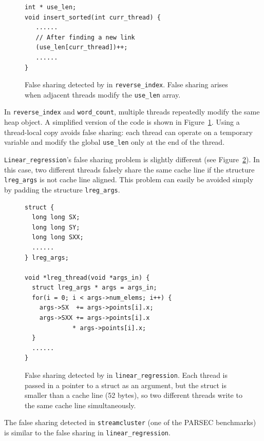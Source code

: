 

\begin{figure}[!t]
\begin{lstlisting}
int * use_len;
void insert_sorted(int curr_thread) {
   ......	
   // After finding a new link
   (use_len[curr_thread])++;
   ......	
}
\end{lstlisting}
\caption{False sharing detected by \sheriffdetect{} in \texttt{reverse\_index}. False sharing arises when adjacent threads 
modify the \texttt{use\_len} array. 
\label{fig:reverseindex}}
\end{figure}

In \texttt{reverse\_index} and \texttt{word\_count}, multiple threads
repeatedly modify the same heap object. A simplified version of the
code is shown in Figure~\ref{fig:reverseindex}. Using a
thread-local copy avoids false sharing: each thread can operate on a
temporary variable and modify the global \texttt{use\_len} only at the
end of the thread.

\texttt{Linear\_regression}'s false sharing problem is slightly different 
(see Figure~\ref{fig:linear_regression}). 
In this case, two different threads falsely share the same cache line if the
structure \texttt{lreg\_args} is not cache line aligned. This problem
can easily be avoided simply by padding the structure \texttt{lreg\_args}.


\begin{figure}[!t]
\begin{lstlisting}
struct {
  long long SX;
  long long SY;
  long long SXX;
  ......
} lreg_args;

void *lreg_thread(void *args_in) {
  struct lreg_args * args = args_in;
  for(i = 0; i < args->num_elems; i++) {
    args->SX  += args->points[i].x;
    args->SXX += args->points[i].x 
   	         * args->points[i].x;
  }
  ......	
}
\end{lstlisting}
\caption{False sharing detected by \sheriffdetect{} in \texttt{linear\_regression}.
Each thread is passed in a pointer to a struct as an argument, but the struct is smaller than a
cache line (52 bytes), so two different threads write to the same cache line simultaneously. 
\label{fig:linear_regression}}
\end{figure}

The false sharing detected in \texttt{streamcluster} (one of
the PARSEC benchmarks) is similar to the false sharing 
in \texttt{linear\_regression}. 

